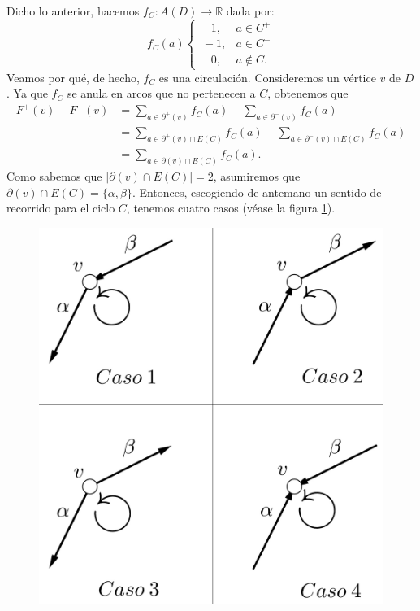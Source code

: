 Dicho lo anterior, hacemos $f_{C} \colon A(D) \rightarrow \mathbb{R}$ dada por:
$$
f_{C}(a)\left\{\begin{matrix}
\quad 1, & a \in C^{+} \\ 
\ -1, & a \in C^{-}\\ 
\quad 0, &a \notin C.
\end{matrix}\right.
$$
Veamos por qué, de hecho, $f_{C}$ es una circulación. Consideremos un vértice $v$ de $D$. Ya que $f_{C}$ se anula en arcos que no pertenecen a $C$, obtenemos que
\begin{equation} \label{eq:cortescicloscasos}
    \begin{split}
               F^{+}(v) - F^{-}(v) &= \sum_{a \in \partial^{+}(v)} f_{C}(a) - \sum_{a \in \partial^{-}(v)} f_{C}(a) \\
    &= \sum_{a \in \partial^{+}(v) \cap E(C)} f_{C}(a) - \sum_{a \in \partial^{-}(v) \cap E(C)} f_{C}(a) \\
    &= \sum_{a \in \partial(v) \cap E(C)} f_{C}(a).
    \end{split}
\end{equation}
Como sabemos que $|\partial(v) \cap E(C)| = 2$, asumiremos que $\partial(v) \cap E(C) = \{\alpha, \beta\}$. Entonces, escogiendo de antemano un sentido de recorrido para el ciclo $C$, tenemos cuatro casos (véase la figura \ref{fig:casoscortesciclos}). 
 \begin{figure}[H]
\centering
\includegraphics[scale=0.2]{img/imgchapter2/digraficacicloscasos.jpg}
\caption{}
\label{fig:casoscortesciclos}
\end{figure}

